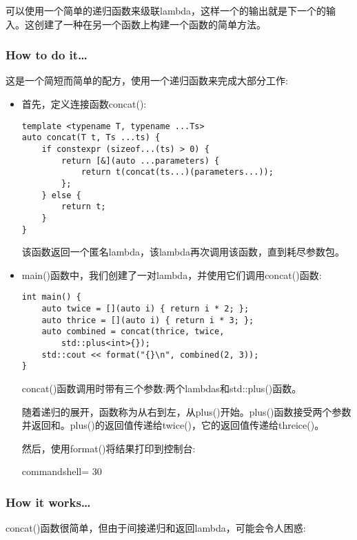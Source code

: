 
可以使用一个简单的递归函数来级联lambda，这样一个的输出就是下一个的输入。这创建了一种在另一个函数上构建一个函数的简单方法。

\subsubsection{How to do it…}

这是一个简短而简单的配方，使用一个递归函数来完成大部分工作:

\begin{itemize}
\item 
首先，定义连接函数concat():

\begin{lstlisting}[style=styleCXX]
template <typename T, typename ...Ts>
auto concat(T t, Ts ...ts) {
	if constexpr (sizeof...(ts) > 0) {
		return [&](auto ...parameters) {
			return t(concat(ts...)(parameters...));
		};
	} else {
		return t;
	}
}
\end{lstlisting}

该函数返回一个匿名lambda，该lambda再次调用该函数，直到耗尽参数包。

\item 
main()函数中，我们创建了一对lambda，并使用它们调用concat()函数:

\begin{lstlisting}[style=styleCXX]
int main() {
	auto twice = [](auto i) { return i * 2; };
	auto thrice = [](auto i) { return i * 3; };
	auto combined = concat(thrice, twice,
		std::plus<int>{});
	std::cout << format("{}\n", combined(2, 3));
}
\end{lstlisting}

concat()函数调用时带有三个参数:两个lambdas和std::plus()函数。

随着递归的展开，函数称为从右到左，从plus()开始。plus()函数接受两个参数并返回和。plus()的返回值传递给twice()，它的返回值传递给threice()。

然后，使用format()将结果打印到控制台:

\begin{tcblisting}{commandshell={}}
30
\end{tcblisting}

\end{itemize}

\subsubsection{How it works…}

concat()函数很简单，但由于间接递归和返回lambda，可能会令人困惑:

